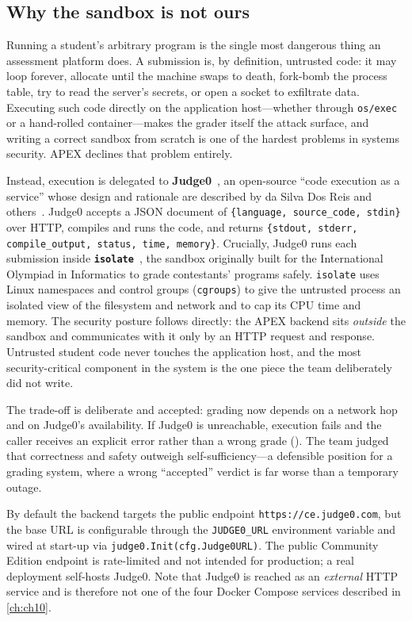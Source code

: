 \subsection{Why the sandbox is not ours}

Running a student's arbitrary program is the single most dangerous thing an assessment
platform does. A submission is, by definition, untrusted code: it may loop forever, allocate
until the machine swaps to death, fork-bomb the process table, try to read the server's
secrets, or open a socket to exfiltrate data. Executing such code directly on the
application host---whether through \texttt{os/exec} or a hand-rolled container---makes the
grader itself the attack surface, and writing a correct sandbox from scratch is one of the
hardest problems in systems security. APEX declines that problem entirely.

Instead, execution is delegated to \textbf{Judge0}~\cite{judge0}, an open-source
``code execution as a service'' whose design and rationale are described by da Silva Dos Reis and others~\cite{dosilovic2018judge0}.
Judge0 accepts a JSON document of \texttt{\{language, source\_code, stdin\}} over HTTP,
compiles and runs the code, and returns \texttt{\{stdout, stderr, compile\_output, status,
time, memory\}}. Crucially, Judge0 runs each submission inside
\textbf{\texttt{isolate}}~\cite{isolate}, the sandbox originally built for the International
Olympiad in Informatics to grade contestants' programs safely. \texttt{isolate} uses Linux
namespaces and control groups (\texttt{cgroups}) to give the untrusted process an isolated
view of the filesystem and network and to cap its CPU time and memory. The security posture
follows directly: the APEX backend sits \emph{outside} the sandbox and communicates with it
only by an HTTP request and response. Untrusted student code never touches the application
host, and the most security-critical component in the system is the one piece the team
deliberately did not write.

The trade-off is deliberate and accepted: grading now depends on a network hop and on Judge0's
availability. If Judge0 is unreachable, execution fails and the caller receives an explicit
error rather than a wrong grade (). The team judged that
correctness and safety outweigh self-sufficiency---a defensible position for a grading
system, where a wrong ``accepted'' verdict is far worse than a temporary outage.

By default the backend targets the public endpoint \texttt{https://ce.judge0.com}, but the
base URL is configurable through the \texttt{JUDGE0\_URL} environment variable and wired at
start-up via \texttt{judge0.Init(cfg.Judge0URL)}. The public Community Edition endpoint is
rate-limited and not intended for production; a real deployment self-hosts Judge0. Note that
Judge0 is reached as an \emph{external} HTTP service and is therefore not one of the four
Docker Compose services described in \cref{ch:ch10}.

